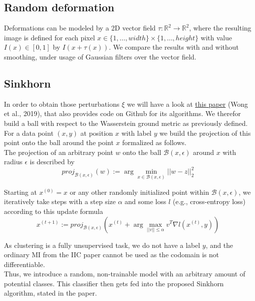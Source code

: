 \documentclass[]{article}
\begin{document}
\subsection{Random deformation}
Deformations can be modeled by a 2D vector field $\tau: \mathbb{R}^2 \rightarrow \mathbb{R}^2$, where the resulting image is defined for each pixel $x\in\{1,\dots,width\}\times\{1,\dots,height\}$ with value $I(x)\in[0,1]$ by $I(x + \tau(x))$. We compare the results with and without smoothing, under usage of Gaussian filters over the vector field.

\subsection{Sinkhorn}
In order to obtain those perturbations $\xi$ we will have a look at \href{http://proceedings.mlr.press/v97/wong19a/wong19a.pdf}{this paper} (Wong et al., 2019), that also provides code on Github for its algorithms. We therefor build a ball with respect to the Wasserstein ground metric as previously defined. For a data point $(x,y)$ at position $x$ with label $y$ we build the projection of this point onto the ball around the point $x$ formalized as follows.\\

The projection of an arbitrary point $w$ onto the ball $\mathcal{B}(x,\epsilon)$ around $x$ with radius $\epsilon$ is described by
\begin{equation}
	proj_{\mathcal{B}(x,\epsilon)}(w):=\arg \min_{x\in\mathcal{B}(x,\epsilon)}||w-z||^2_2
\end{equation}

Starting at $x^{(0)}=x$ or any other randomly initialized point within $\mathcal{B}(x,\epsilon)$, we iteratively take steps with a step size $\alpha$ and some loss $l$ (e.g., cross-entropy loss) according to this update formula
\begin{equation}
	x^{(t+1)} := proj_{\mathcal{B}(x,\epsilon)} (x^{(t)} + \arg \max_{||v||\leq\alpha}v^T\nabla l(x^{(t)},y))
\end{equation}

As clustering is a fully unsupervised task, we do not have a label $y$, and the ordinary MI from the IIC paper cannot be used as the codomain is not differentiable. \\
Thus, we introduce a random, non-trainable model with an arbitrary amount of potential classes. This classifier then gets fed into the proposed Sinkhorn algorithm, stated in the paper. \\
\end{document}
